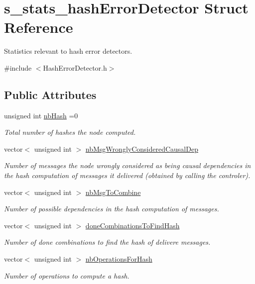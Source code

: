 \hypertarget{structs__stats__hash_error_detector}{}\section{s\+\_\+stats\+\_\+hash\+Error\+Detector Struct Reference}
\label{structs__stats__hash_error_detector}


Statistics relevant to hash error detectors.  




{\ttfamily \#include $<$Hash\+Error\+Detector.\+h$>$}

\subsection*{Public Attributes}
\begin{DoxyCompactItemize}
\item 
unsigned int \hyperlink{structs__stats__hash_error_detector_a10b1af7c249bf232e739b50c5faed021}{nb\+Hash} =0
\begin{DoxyCompactList}\small\item\em Total number of hashes the node computed. \end{DoxyCompactList}\item 
vector$<$ unsigned int $>$ \hyperlink{structs__stats__hash_error_detector_ac8f99ce678b3938dc049ff074040b999}{nb\+Msg\+Wrongly\+Considered\+Causal\+Dep}
\begin{DoxyCompactList}\small\item\em Number of messages the node wrongly considered as being causal dependencies in the hash computation of messages it delivered (obtained by calling the controler). \end{DoxyCompactList}\item 
vector$<$ unsigned int $>$ \hyperlink{structs__stats__hash_error_detector_ab765b1ecec0ec33fec5968fb28d5e4fb}{nb\+Msg\+To\+Combine}
\begin{DoxyCompactList}\small\item\em Number of possible dependencies in the hash computation of messages. \end{DoxyCompactList}\item 
vector$<$ unsigned int $>$ \hyperlink{structs__stats__hash_error_detector_a82622eb0b2a4d41fc33df25c6360dc79}{done\+Combinations\+To\+Find\+Hash}
\begin{DoxyCompactList}\small\item\em Number of done combinations to find the hash of delivere messages. \end{DoxyCompactList}\item 
vector$<$ unsigned int $>$ \hyperlink{structs__stats__hash_error_detector_a64dab27e3314cfc2a233f620f0309782}{nb\+Operations\+For\+Hash}
\begin{DoxyCompactList}\small\item\em Number of operations to compute a hash. \end{DoxyCompactList}\end{DoxyCompactItemize}


